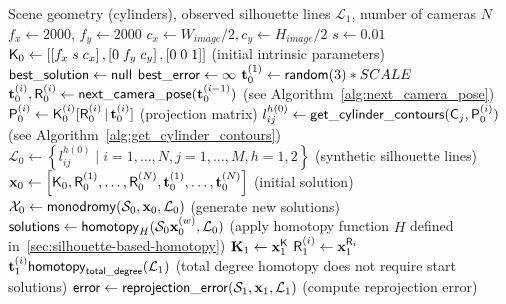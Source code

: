 \begin{algorithm}[H]
\caption{Solution Generation and Homotopy Procedure}
\label{alg:solutions_generation}
\begin{algorithmic}[1]
\REQUIRE Scene geometry (cylinders), observed silhouette lines $\mathcal{L}_1$, number of cameras $N$
\STATE $f_x \gets 2000$, $f_y \gets 2000$
\STATE $c_x \gets W_{image}/2, c_y \gets H_{image}/2$
\STATE $s \gets 0.01$
\STATE $\mathsf{K}_0 \gets \left[
                \left[ f_x\; s \; c_x \right],
                \left[ 0 \; f_y \; c_y \right],
                \left[ 0 \; 0 \; 1 \right]
            \right]$ \; \; (initial intrinsic parameters)
\STATE $\mathsf{best\_solution} \gets \mathsf{null}$
\STATE $\mathsf{best\_error} \gets \infty$
\STATE $\mathbf{t}_0^{(1)} \gets \mathsf{random}(3) * SCALE$
    \STATE $\mathbf{t}_0^{(i)}, \mathsf{R}_0^{(i)} \gets \mathsf{next\_camera\_pose}(\mathbf{t}_0^{(i-1)})$ \; \; (see Algorithm~\ref{alg:next_camera_pose})
\ENDFOR
{}
            \STATE $\mathsf{P}_0^{(i)} \gets \mathsf{K}_0^{(i)} [\mathsf{R}_0^{(i)}\,|\,\mathbf{t}_0^{(i)}]$ \; \; (projection matrix)
            \STATE $l_{ij}^{h(0)} \gets \mathsf{get\_cylinder\_contours}(\mathsf{C}_j, \mathsf{P}_0^{(i)})$ \; \; (see Algorithm~\ref{alg:get_cylinder_contours})
        \ENDFOR
    \ENDFOR
    \STATE $\mathcal{L}_0 \gets \left\{ l_{ij}^{h(0)} \mid i=1,\ldots,N, j=1,\ldots,M, h=1,2 \right\}$ \; \; (synthetic silhouette lines)
    \STATE $\mathbf{x}_0 \gets \left[\mathsf{K}_0, \mathsf{R}_0^{(1)}, \ldots, \mathsf{R}_0^{(N)}, \mathbf{t}_0^{(1)}, \ldots, \mathbf{t}_0^{(N)}\right]$ \; \; (initial solution)
    \STATE $\mathcal{X}_0 \gets \mathsf{monodromy}(\mathcal{S}_0, \mathbf{x}_0, \mathcal{L}_0)$ \; \; (generate new solutions)
        \STATE $\mathsf{solutions} \gets \mathsf{homotopy}_H(\mathcal{S}_0 \mathbf{x}_0^{(w)}, \mathcal{L}_0)$ \; \; (apply homotopy function $H$ defined in~\eqref{sec:silhouette-based-homotopy})
            \STATE $\mathbf{K}_1 \gets \mathbf{x}_1^{\mathsf{K}}$
                \STATE $\mathsf{R}_1^{(i)} \gets \mathbf{x}_1^{\mathsf{R}_i}$
                \STATE $\mathbf{t}_1^{(i)} \mathsf{homotopy}_{\mathsf{total\_degree}}(\mathcal{L}_1)$ \; \; (total degree homotopy does not require start solutions)
            \ENDFOR
            \STATE $\mathsf{error} \gets \mathsf{reprojection\_error}(\mathcal{S}_1, \mathbf{x}_1, \mathcal{L}_1)$ \; \; (compute reprojection error)

\end{algorithmic}
\end{algorithm}

